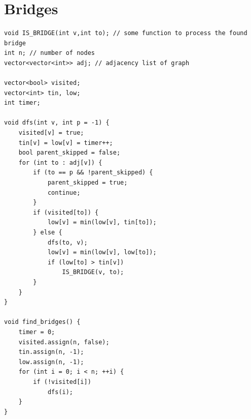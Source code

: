 \documentclass{article}
\begin{document}
\section{Bridges}
\begin{lstlisting}
void IS_BRIDGE(int v,int to); // some function to process the found bridge
int n; // number of nodes
vector<vector<int>> adj; // adjacency list of graph

vector<bool> visited;
vector<int> tin, low;
int timer;

void dfs(int v, int p = -1) {
    visited[v] = true;
    tin[v] = low[v] = timer++;
    bool parent_skipped = false;
    for (int to : adj[v]) {
        if (to == p && !parent_skipped) {
            parent_skipped = true;
            continue;
        }
        if (visited[to]) {
            low[v] = min(low[v], tin[to]);
        } else {
            dfs(to, v);
            low[v] = min(low[v], low[to]);
            if (low[to] > tin[v])
                IS_BRIDGE(v, to);
        }
    }
}

void find_bridges() {
    timer = 0;
    visited.assign(n, false);
    tin.assign(n, -1);
    low.assign(n, -1);
    for (int i = 0; i < n; ++i) {
        if (!visited[i])
            dfs(i);
    }
}
\end{lstlisting}
\end{document}
